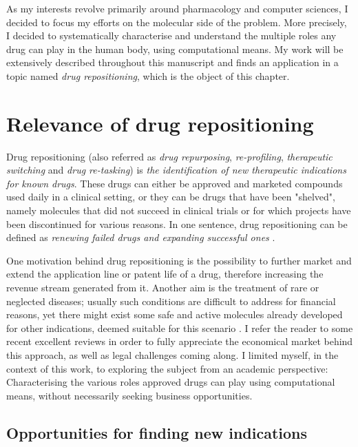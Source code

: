 As my interests revolve primarily around pharmacology and computer sciences, I decided to focus my efforts on the molecular side of the problem. More precisely, I decided to systematically characterise and understand the multiple roles any drug can play in the human body, using computational means. My work will be extensively described throughout this manuscript and finds an application in a topic named \emph{drug repositioning}, which is the object of this chapter.

\section{Relevance of drug repositioning}

Drug repositioning (also referred as \emph{drug repurposing}, \emph{re-profiling}, \emph{therapeutic switching} and \emph{drug re-tasking}) is \emph{the identification of new therapeutic indications for known drugs}. These drugs can either be approved and marketed compounds used daily in a clinical setting, or they can be drugs that have been "shelved", namely molecules that did not succeed in clinical trials or for which projects have been discontinued for various reasons. In one sentence, drug repositioning can be defined as \emph{renewing failed drugs and expanding successful ones} \citep{barratt2012drug}.

One motivation behind drug repositioning is the possibility to further market and extend the application line or patent life of a drug, therefore increasing the revenue stream generated from it. Another aim is the treatment of rare or neglected diseases; usually such conditions are difficult to address for financial reasons, yet there might exist some safe and active molecules already developed for other indications, deemed suitable for this scenario \citep{men20101}. I refer the reader to some recent excellent reviews \citep{ashburn2004drug} \citep{dudley2011exploiting} \citep{hurle2013computational} in order to fully appreciate the economical market behind this approach, as well as legal challenges coming along. I limited myself, in the context of this work, to exploring the subject from an academic perspective: Characterising the various roles approved drugs can play using computational means, without necessarily seeking business opportunities.

\subsection{Opportunities for finding new indications}
\label{sec:opp}

